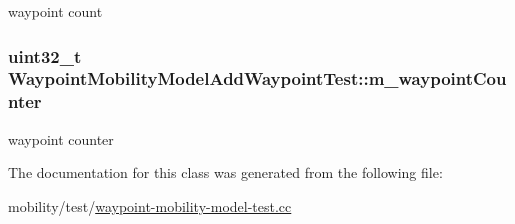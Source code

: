 waypoint count 

\subsubsection[{\texorpdfstring{m\+\_\+waypoint\+Counter}{m_waypointCounter}}]{\setlength{\rightskip}{0pt plus 5cm}uint32\+\_\+t Waypoint\+Mobility\+Model\+Add\+Waypoint\+Test\+::m\+\_\+waypoint\+Counter\hspace{0.3cm}{\ttfamily [private]}}\hypertarget{classWaypointMobilityModelAddWaypointTest_a7e15fee40f671868d937ca440d71f5e1}{}\label{classWaypointMobilityModelAddWaypointTest_a7e15fee40f671868d937ca440d71f5e1}


waypoint counter 



The documentation for this class was generated from the following file\+:\begin{DoxyCompactItemize}
\item 
mobility/test/\hyperlink{waypoint-mobility-model-test_8cc}{waypoint-\/mobility-\/model-\/test.\+cc}\end{DoxyCompactItemize}
